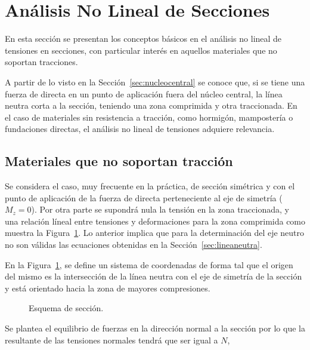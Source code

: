 \section{Análisis No Lineal de Secciones}

En esta sección se presentan los conceptos básicos en el análisis no lineal de tensiones en secciones, con particular interés en aquellos materiales que no soportan tracciones.

A partir de lo visto en la Sección~\ref{sec:nucleocentral} se conoce que, si se tiene una fuerza de directa en un punto de aplicación fuera del núcleo central, la línea neutra corta a la sección, teniendo una zona comprimida y otra traccionada. %
%
En el caso de materiales sin resistencia a tracción, como hormigón,  mampostería o fundaciones directas, el análisis no lineal de tensiones adquiere relevancia. %
%

\subsection{Materiales que no soportan tracción}

Se considera el caso, muy frecuente en la práctica, de sección simétrica y con el punto de aplicación de la fuerza de directa perteneciente al eje de simetría ($M_z=0$). Por otra parte se supondrá nula la tensión en la zona traccionada, y una relación líneal entre tensiones y deformaciones para la zona comprimida como muestra la Figura~\ref{fig:MNSTesquema}. Lo anterior implica que para la determinación del eje neutro no son válidas las ecuaciones obtenidas en la Sección~\ref{sec:lineaneutra}.

En la Figura~\ref{fig:MNSTesquema}, se define un sistema de coordenadas de forma tal que el origen del mismo es la intersección de la línea neutra con el eje de simetría de la sección y está orientado hacia la zona de mayores compresiones.

\begin{figure}[htb]
	\centering
{}
\hspace{0.01\textwidth}
\caption{Esquema de sección.}
	\label{fig:MNSTesquema}
\end{figure}

Se plantea el equilibrio de fuerzas en la dirección normal a la sección por lo que la resultante de las tensiones normales tendrá que ser igual a $N$,

